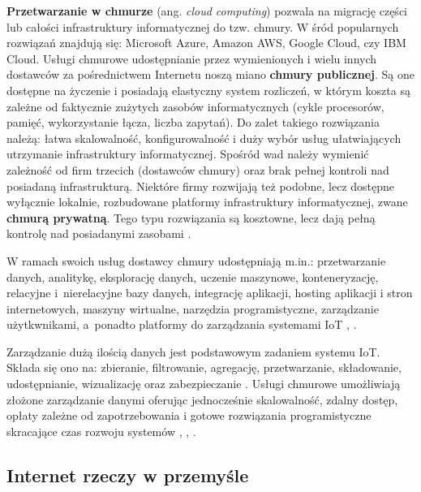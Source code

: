 \documentclass[a4paper, 12pt, twoside]{article}
\begin{document}
\textbf{Przetwarzanie w chmurze} (ang. \emph{cloud computing}) pozwala
na migrację części lub całości infrastruktury informatycznej do tzw. chmury.
W śród popularnych rozwiązań znajdują się:
Microsoft Azure, Amazon AWS, Google Cloud, czy IBM Cloud. Usługi chmurowe
udostępnianie przez wymienionych i wielu innych dostawców za pośrednictwem Internetu
noszą miano \textbf{chmury publicznej}.
Są one dostępne na życzenie i posiadają elastyczny
system rozliczeń, w którym koszta są zależne od faktycznie zużytych zasobów informatycznych
(cykle procesorów, pamięć, wykorzystanie łącza, liczba zapytań). Do zalet takiego
rozwiązania należą: łatwa skalowalność, konfigurowalność i duży wybór usług
ułatwiających utrzymanie infrastruktury informatycznej. Spośród wad należy wymienić
zależność od firm trzecich (dostawców chmury) oraz brak pełnej kontroli nad
posiadaną infrastrukturą. Niektóre firmy rozwijają też podobne, lecz dostępne
wyłącznie lokalnie, rozbudowane platformy infrastruktury informatycznej, zwane \textbf{chmurą prywatną}.
Tego typu rozwiązania są kosztowne, lecz dają pełną kontrolę nad posiadanymi zasobami \cite{iot-hype-to-reality}.

W ramach swoich usług dostawcy chmury udostępniają m.in.: przetwarzanie danych,
analitykę, eksplorację danych, uczenie maszynowe, konteneryzację, relacyjne i~nierelacyjne
bazy danych, integrację aplikacji, hosting aplikacji i stron internetowych,
maszyny wirtualne, narzędzia programistyczne, zarządzanie użytkwnikami, a~ponadto
platformy do zarządzania systemami IoT \cite{aws}, \cite{azure}.

Zarządzanie dużą ilością danych jest podstawowym zadaniem systemu IoT. Składa się ono
na: zbieranie, filtrowanie, agregację, przetwarzanie, składowanie, udostępnianie,
wizualizację oraz zabezpieczanie \cite{intro-to-iot}. Usługi chmurowe umożliwiają złożone zarządzanie
danymi oferując jednocześnie skalowalność, zdalny dostęp, opłaty zależne od zapotrzebowania
i gotowe rozwiązania programistyczne skracające czas rozwoju systemów
\cite{measuring-value-of-cloud-computing}, \cite{iot-and-cloud}, \cite{iot-in-industrial-sector}.

\subsection{Internet rzeczy w przemyśle}\label{iiot}
\end{document}
